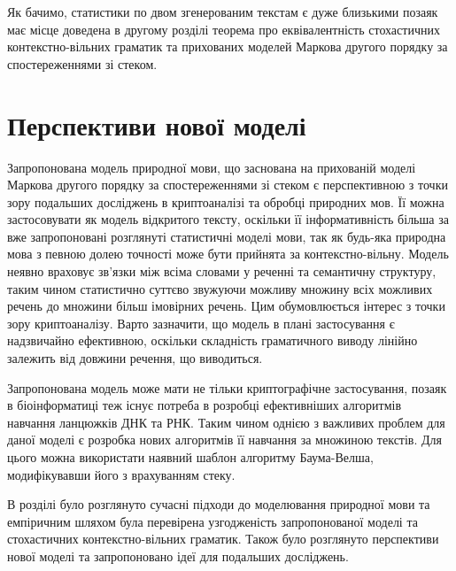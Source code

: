 Як бачимо, статистики по двом згенерованим текстам є дуже близькими позаяк має місце доведена в другому розділі теорема про еквівалентність стохастичних контекстно-вільних граматик та прихованих моделей Маркова другого порядку за спостереженнями зі стеком.

\section{Перспективи нової моделі}
Запропонована модель природної мови, що заснована на прихованій моделі Маркова другого порядку за спостереженнями зі стеком є перспективною з точки зору подальших досліджень в криптоаналізі та обробці природних мов. Її можна застосовувати як модель відкритого тексту, оскільки її інформативність більша за вже запропоновані розглянуті статистичні моделі мови, так як будь-яка природна мова з певною долею точності може бути прийнята за контекстно-вільну. Модель неявно враховує зв'язки між всіма словами у реченні та семантичну структуру, таким чином статистично суттєво звужуючи можливу множину всіх можливих речень до множини більш імовірних речень. Цим обумовлюється інтерес з точки зору криптоаналізу. Варто зазначити, що модель в плані застосування є надзвичайно ефективною, оскільки складність граматичного виводу лінійно залежить від довжини речення, що виводиться.

Запропонована модель може мати не тільки криптографічне застосування, позаяк в біоінформатиці теж існує потреба в розробці ефективніших алгоритмів навчання ланцюжків ДНК та РНК. Таким чином однією з важливих  проблем для даної моделі є розробка нових алгоритмів її навчання за множиною текстів. Для цього можна використати наявний шаблон алгоритму Баума-Велша, модифікувавши його з врахуванням стеку.

\chapconclude{\ref{chap:practice}}
В розділі було розглянуто сучасні підходи до моделювання природної мови та емпіричним шляхом була перевірена узгодженість запропонованої моделі та стохастичних контекстно-вільних граматик. Також було розглянуто перспективи нової моделі та запропоновано ідеї для подальших досліджень.

